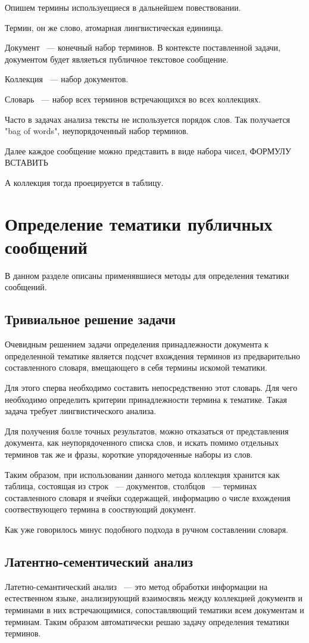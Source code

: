 \documentclass[annotation,times,page4]{itmo-student-thesis}
\begin{document}
Опишем термины используещиеся в дальнейшем повествовании. 

Термин, он же слово, атомарная лингвистическая единиица.

Документ ~--- конечный набор терминов. В контексте поставленной задачи, документом будет являеться публичное текстовое сообщение.

Коллекция ~--- набор документов.

Словарь ~--- набор всех терминов встречающихся во всех коллекциях.

Часто в задачах анализа тексты не используется порядок слов. Так получается "bag of words", неупорядоченный набор терминов.

Далее каждое сообщение можно представить в виде набора чисел, ФОРМУЛУ ВСТАВИТЬ

А коллекция тогда проецируется в таблицу.  
\section{Определение тематики публичных сообщений}
В данном разделе описаны применявшиеся методы для определения тематики сообщений.
\subsection{Тривиальное решение задачи}
Очевидным решением задачи определения принадлежности документа к определенной тематике является подсчет вхождения терминов из предварительно составленного словаря, вмещающего в себя термины искомой тематики.

Для этого сперва необходимо составить непосредственно этот словарь. Для чего необходимо определить критерии принадлежности термина к тематике. Такая задача требует лингвистического анализа.

Для получения болле точных результатов, можно отказаться от представления документа, как неупорядоченного списка слов, и искать помимо отдельных терминов так же и фразы, короткие упорядоченные наборы из слов.

Таким образом, при использовании данного метода коллекция хранится как таблица, состоящая из строк ~--- документов, столбцов ~--- терминах составленного словаря и ячейки содержащей, информацию о числе вхождения соотвествующего термина в сооствующий документ.

Как уже говорилось минус подобного подхода в ручном составлении словаря.
\subsection{Латентно-сементический анализ}
Латетно-семантический анализ ~--- это метод обработки информации на естественном языке, анализирующий взаимосвязь между коллекцией документв и терминами в них встречающимися, сопоставляющий тематики всем документам и терминам. Таким образом автоматически решаю задачу определения тематики терминов.
\end{document}
